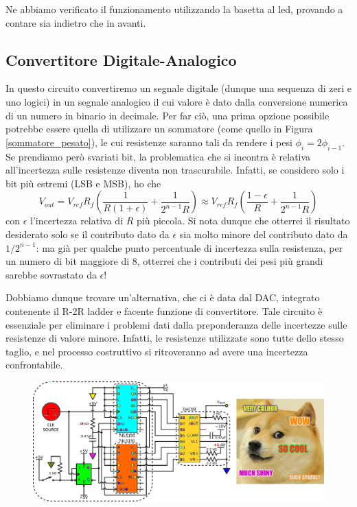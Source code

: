 Ne abbiamo verificato il funzionamento utilizzando la basetta al led, provando a contare sia indietro che in avanti. 

\subsection{Convertitore Digitale-Analogico}

In questo circuito convertiremo un segnale digitale (dunque una sequenza di zeri e uno logici) in un segnale analogico il cui valore è dato dalla conversione numerica di un numero in binario in decimale. Per far ciò, una prima opzione possibile potrebbe essere quella di utilizzare un sommatore (come quello in Figura \ref{sommatore_pesato}), le cui resistenze saranno tali da rendere i pesi $\phi_i = 2 \phi_{i -1}$. Se prendiamo però svariati bit, la problematica che si incontra è relativa all'incertezza sulle resistenze diventa non trascurabile. Infatti, se considero solo i bit più estremi (LSB e MSB), ho che
$$V_{out}=V_{ref} R_f \left( \frac{1}{R (1 + \epsilon)} + \frac{1}{2^{n-1}R}\right) \approx V_{ref} R_f \left( \frac{1 - \epsilon}{R} + \frac{1}{2^{n-1}R}\right)$$
con $\epsilon$ l'incertezza relativa di $R$ più piccola. Si nota dunque che otterrei il risultato desiderato solo se il contributo dato da $\epsilon$ sia molto minore del contributo dato da $1/2^{n-1}$: ma già per qualche punto percentuale di incertezza sulla resistenza, per un numero di bit maggiore di 8, otterrei che i contributi dei pesi più grandi sarebbe sovrastato da $\epsilon$!

Dobbiamo dunque trovare un'alternativa, che ci è data dal DAC, integrato contenente il R-2R ladder e facente funzione di convertitore. Tale circuito è essenziale per eliminare i problemi dati dalla preponderanza delle incertezze sulle resistenze di valore minore. Infatti, le resistenze utilizzate sono tutte dello stesso taglio, e nel processo costruttivo si ritroveranno ad avere una incertezza confrontabile.

\begin{figure}[htpc]
\centering
	\includegraphics[width=.95\textwidth]{../E12/latex/specialDAC.pdf}
	\caption{}
	\label{cir12:DAC}
\end{figure}

